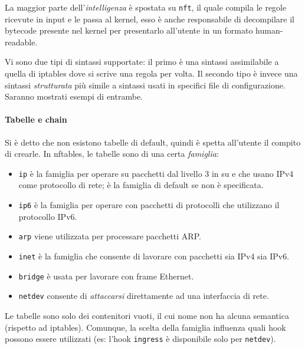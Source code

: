 La maggior parte dell'\textit{intelligenza} è spostata su \texttt{nft}, il quale compila
le regole ricevute in input e le passa al kernel, esso è anche responsabile di
decompilare il bytecode presente nel kernel per presentarlo all'utente in un
formato human-readable.

Vi sono due tipi di sintassi supportate: il primo è una sintassi assimilabile a quella
di iptables dove si scrive una regola per volta. Il secondo tipo è invece
una sintassi \textit{strutturata} più simile a sintassi usati in specifici
file di configurazione. Saranno mostrati esempi di entrambe.


\paragraph{Tabelle e chain}
Si è detto che non esistono tabelle di default, quindi è spetta all'utente
il compito di crearle. In nftables, le tabelle sono di una certa \textit{famiglia}:
\begin{itemize}
  \item \texttt{ip} è la famiglia per operare su pacchetti dal livello 3 in su e
  che usano IPv4 come protocollo di rete; è la famiglia di default se non è specificata.
  \item \texttt{ip6} è la famiglia per operare con pacchetti di protocolli che utilizzano
  il protocollo IPv6.
  \item \texttt{arp} viene utilizzata per processare pacchetti ARP.
  \item \texttt{inet} è la famiglia che consente di lavorare con pacchetti sia IPv4
  sia IPv6.
  \item \texttt{bridge} è usata per lavorare con frame Ethernet.
  \item \texttt{netdev} consente di \textit{attaccarsi} direttamente ad una interfaccia
  di rete.
\end{itemize}
Le tabelle sono solo dei contenitori vuoti, il cui nome non ha alcuna semantica (rispetto
ad iptables). Comunque, la scelta della famiglia influenza quali hook possono
essere utilizzati (es: l'hook \texttt{ingress} è disponibile solo per \texttt{netdev}).

